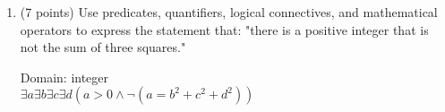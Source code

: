 \documentclass[11pt]{article}
\newcommand{\pt}[1]{\textcolor{maincolor}{(#1 points)}}
\begin{document}
\begin{justify}
\begin{enumerate}
    \item \pt{7} Use predicates, quantifiers, logical connectives, and mathematical operators to express the statement that: "there is a positive integer that is not the sum of three squares."
    \begin{mdframed}
        Domain: integer \\
        $\exists a \exists b \exists c \exists d (a > 0 \land \lnot (a = b^2+c^2+d^2))$
    \end{mdframed}

    
    
\end{enumerate}
\end{justify}
\end{document}
